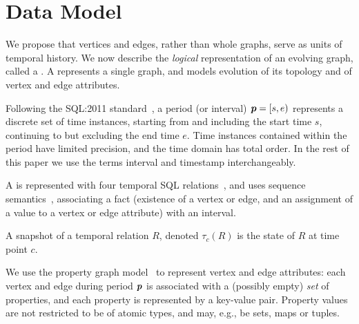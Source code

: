 \section{Data Model}
\label{sec:model}

We propose that vertices and edges, rather than whole graphs, serve as
units of temporal history.  We now describe the {\em logical}
representation of an evolving graph, called a \tg.  A \tg represents a
single graph, and models evolution of its topology and of vertex and
edge attributes.  

Following the SQL:2011
standard~\cite{DBLP:journals/sigmod/KulkarniM12}, a period (or
interval) $\boldsymbol{p} = [s, e)$ represents a discrete set of time instances,
  starting from and including the start time $s$, continuing to but
  excluding the end time $e$.  Time instances contained within the
  period have limited precision, and the time domain has total order.
  In the rest of this paper we use the terms interval and timestamp
  interchangeably.


A \tg is represented with four temporal SQL
relations~\cite{DBLP:conf/vldb/BohlenSS96}, and uses sequence
semantics~\cite{Dignos2012}, associating a fact (existence of a vertex
or edge, and an assignment of a value to a vertex or edge attribute)
with an interval.

A snapshot of a temporal relation $R$, denoted $\tau_c(R)$ is the
state of $R$ at time point $c$.

We use the property graph model~\cite{GraphDB} to represent vertex and
edge attributes: each vertex and edge during period $\boldsymbol{p}$ is
associated with a (possibly empty) {\em set} of properties, and each
property is represented by a key-value pair.  Property values are not
restricted to be of atomic types, and may, e.g., be sets, maps or
tuples.

